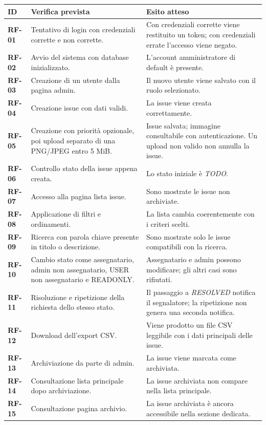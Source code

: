 \documentclass[12pt,a4paper]{article}
\begin{document}
\begin{longtable}{>{\bfseries}p{} p{} p{}}
\toprule
ID & Verifica prevista & Esito atteso \\
\midrule
RF-01 & Tentativo di login con credenziali corrette e non corrette. & Con credenziali corrette viene restituito un token; con credenziali errate l'accesso viene negato. \\
RF-02 & Avvio del sistema con database inizializzato. & L'account amministratore di default è presente. \\
RF-03 & Creazione di un utente dalla pagina admin. & Il nuovo utente viene salvato con il ruolo selezionato. \\
RF-04 & Creazione issue con dati validi. & La issue viene creata correttamente. \\
RF-05 & Creazione con priorità opzionale, poi upload separato di una PNG/JPEG entro 5 MiB. & Issue salvata; immagine consultabile con autenticazione. Un upload non valido non annulla la issue. \\
RF-06 & Controllo stato della issue appena creata. & Lo stato iniziale è \textit{TODO}. \\
RF-07 & Accesso alla pagina lista issue. & Sono mostrate le issue non archiviate. \\
RF-08 & Applicazione di filtri e ordinamenti. & La lista cambia coerentemente con i criteri scelti. \\
RF-09 & Ricerca con parola chiave presente in titolo o descrizione. & Sono mostrate solo le issue compatibili con la ricerca. \\
RF-10 & Cambio stato come assegnatario, admin non assegnatario, USER non assegnatario e READONLY. & Assegnatario e admin possono modificare; gli altri casi sono rifiutati. \\
RF-11 & Risoluzione e ripetizione della richiesta dello stesso stato. & Il passaggio a \textit{RESOLVED} notifica il segnalatore; la ripetizione non genera una seconda notifica. \\
RF-12 & Download dell'export CSV. & Viene prodotto un file CSV leggibile con i dati principali delle issue. \\
RF-13 & Archiviazione da parte di admin. & La issue viene marcata come archiviata. \\
RF-14 & Consultazione lista principale dopo archiviazione. & La issue archiviata non compare nella lista principale. \\
RF-15 & Consultazione pagina archivio. & La issue archiviata è ancora accessibile nella sezione dedicata. \\

\end{longtable}
\end{document}
